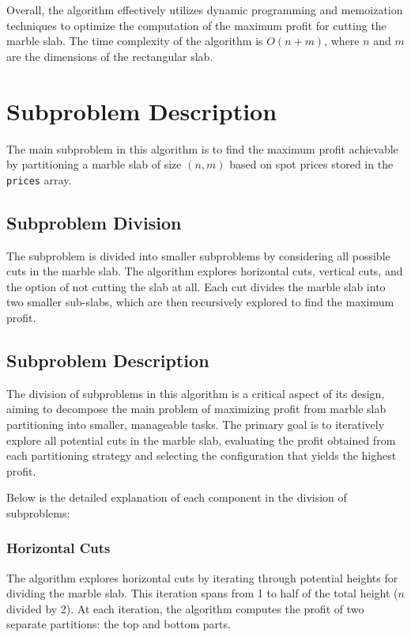 \documentclass{article}
\begin{document}
Overall, the algorithm effectively utilizes dynamic programming and memoization techniques to optimize the computation of the maximum profit for cutting the marble slab. The time complexity of the algorithm is \(O(n + m)\), where \(n\) and \(m\) are the dimensions of the rectangular slab.


\section{Subproblem Description }
The main subproblem in this algorithm is to find the maximum profit achievable by partitioning a marble slab of size $(n, m)$ based on spot prices stored in the \texttt{prices} array.

\subsection{Subproblem Division}
The subproblem is divided into smaller subproblems by considering all possible cuts in the marble slab. The algorithm explores horizontal cuts, vertical cuts, and the option of not cutting the slab at all. Each cut divides the marble slab into two smaller sub-slabs, which are then recursively explored to find the maximum profit.


\subsection{Subproblem Description}

The division of subproblems in this algorithm is a critical aspect of its design, aiming to decompose the main problem of maximizing profit from marble slab partitioning into smaller, manageable tasks. The primary goal is to iteratively explore all potential cuts in the marble slab, evaluating the profit obtained from each partitioning strategy and selecting the configuration that yields the highest profit.

 Below is the detailed explanation of each component in the division of subproblems:

\subsubsection{Horizontal Cuts}


The algorithm explores horizontal cuts by iterating through potential heights for dividing the marble slab. This iteration spans from 1 to half of the total height ($n$ divided by 2). At each iteration, the algorithm computes the profit of two separate partitions: the top and bottom parts.
\end{document}
